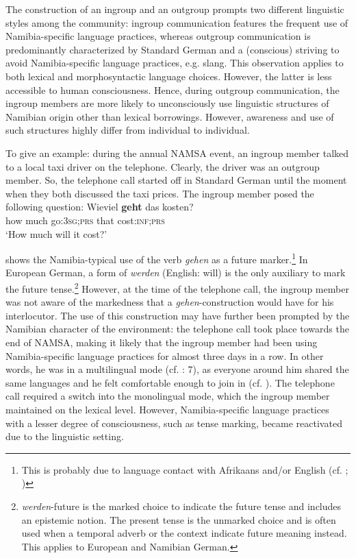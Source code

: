 \documentclass[output=paper]{langsci/langscibook}
\begin{document}
The construction of an ingroup and an outgroup prompts two different linguistic styles among the community: ingroup communication features the frequent use of Namibia-specific language practices, whereas outgroup communication is predominantly characterized by Standard German and a (conscious) striving to avoid Namibia-specific language practices, e.g. slang. This observation applies to both lexical and morphosyntactic language choices. However, the latter is less accessible to human consciousness. Hence, during outgroup communication, the ingroup members are more likely to unconsciously use linguistic structures of Namibian origin other than lexical borrowings. However, awareness and use of such structures highly differ from individual to individual. 

To give an example: during the annual NAMSA event, an ingroup member talked to a local taxi driver on the telephone. Clearly, the driver was an outgroup member. So, the telephone call started off in Standard German until the moment when they both discussed the taxi prices. The ingroup member posed the following question:
\ea
\label{ex:radke:3}
 	\gll Wieviel \textbf{geht} das kosten? \\
		{how much}  go:\textsc{3sg;prs}   that  cost\textsc{:inf;prs}\\
     \glt `How much will it cost?'\\
 \z
 
 shows the Namibia-typical use of the verb \textit{gehen} as a future marker.\footnote{This is probably due to language contact with Afrikaans and/or English (cf. \citealt[33]{shah_german_2007}; \citealt[234--35]{radke_hat_2019b})} In European German, a form of \textit{werden} (English: will) is the only auxiliary to mark the future tense.\footnote{\textit{werden}-future is the marked choice to indicate the future tense and includes an epistemic notion. The present tense is the unmarked choice and is often used when a temporal adverb or the context indicate future meaning instead. This applies to European and Namibian German.}  However, at the time of the telephone call, the ingroup member was not aware of the markedness that a \textit{gehen}-construction would have for his interlocutor. The use of this construction may have further been prompted by the Namibian character of the environment: the telephone call took place towards the end of NAMSA, making it likely that the ingroup member had been using Namibia-specific language practices for almost three days in a row. In other words, he was in a multilingual mode (cf. \citealt{hoder_mehrsprachige_2018}: 7), as everyone around him shared the same languages and he felt comfortable enough to join in (cf. \citealt[2]{grosjean_bilingual_2012}). The telephone call required a switch into the monolingual mode, which the ingroup member maintained on the lexical level. However, Namibia-specific language practices with a lesser degree of consciousness, such as tense marking, became reactivated due to the linguistic setting.
  
\end{document}
